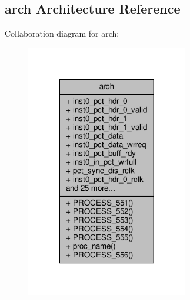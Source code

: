 \subsection{arch Architecture Reference}
\label{classpackets2data_1_1arch}


Collaboration diagram for arch\+:\nopagebreak
\begin{figure}[H]
\begin{center}
\leavevmode
\includegraphics[width=200pt]{dc/d1a/classpackets2data_1_1arch__coll__graph}
\end{center}
\end{figure}
